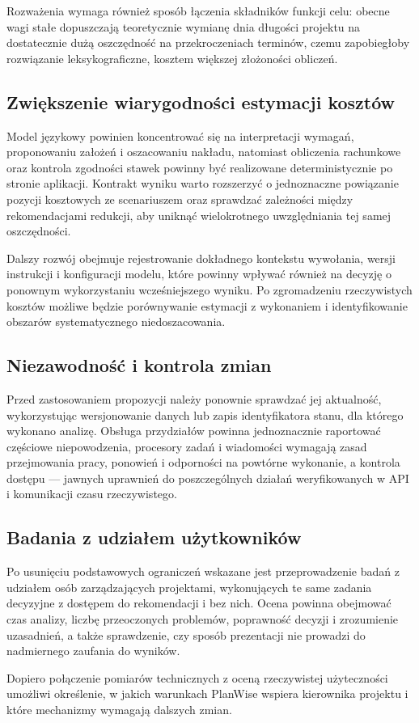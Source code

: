Rozważenia wymaga również sposób łączenia składników funkcji celu: obecne wagi stałe dopuszczają teoretycznie wymianę dnia długości projektu na dostatecznie dużą oszczędność na przekroczeniach terminów, czemu zapobiegłoby rozwiązanie leksykograficzne, kosztem większej złożoności obliczeń.

\subsection{Zwiększenie wiarygodności estymacji kosztów}

Model językowy powinien koncentrować się na interpretacji wymagań, proponowaniu założeń i oszacowaniu nakładu, natomiast obliczenia rachunkowe oraz kontrola zgodności stawek powinny być realizowane deterministycznie po stronie aplikacji. Kontrakt wyniku warto rozszerzyć o jednoznaczne powiązanie pozycji kosztowych ze scenariuszem oraz sprawdzać zależności między rekomendacjami redukcji, aby uniknąć wielokrotnego uwzględniania tej samej oszczędności.

Dalszy rozwój obejmuje rejestrowanie dokładnego kontekstu wywołania, wersji instrukcji i konfiguracji modelu, które powinny wpływać również na decyzję o ponownym wykorzystaniu wcześniejszego wyniku. Po zgromadzeniu rzeczywistych kosztów możliwe będzie porównywanie estymacji z wykonaniem i identyfikowanie obszarów systematycznego niedoszacowania.

\subsection{Niezawodność i kontrola zmian}

Przed zastosowaniem propozycji należy ponownie sprawdzać jej aktualność, wykorzystując wersjonowanie danych lub zapis identyfikatora stanu, dla którego wykonano analizę. Obsługa przydziałów powinna jednoznacznie raportować częściowe niepowodzenia, procesory zadań i wiadomości wymagają zasad przejmowania pracy, ponowień i odporności na powtórne wykonanie, a kontrola dostępu — jawnych uprawnień do poszczególnych działań weryfikowanych w API i komunikacji czasu rzeczywistego.

\subsection{Badania z udziałem użytkowników}

Po usunięciu podstawowych ograniczeń wskazane jest przeprowadzenie badań z udziałem osób zarządzających projektami, wykonujących te same zadania decyzyjne z dostępem do rekomendacji i bez nich. Ocena powinna obejmować czas analizy, liczbę przeoczonych problemów, poprawność decyzji i zrozumienie uzasadnień, a także sprawdzenie, czy sposób prezentacji nie prowadzi do nadmiernego zaufania do wyników.

Dopiero połączenie pomiarów technicznych z oceną rzeczywistej użyteczności umożliwi określenie, w jakich warunkach PlanWise wspiera kierownika projektu i które mechanizmy wymagają dalszych zmian.